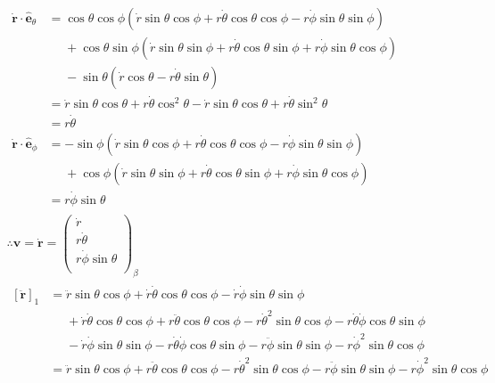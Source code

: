 \documentclass[12pt]{article}
\begin{document}
\begin{gather*}
	\begin{aligned}
		\dot{\mathbf{r}} \cdot \hat{\mathbf{e}}_\theta &= 
			\cos\theta\cos\phi (\dot{r}\sin\theta\cos\phi +
				r\dot{\theta}\cos\theta\cos\phi - r\dot{\phi}\sin\theta\sin\phi) \\
			&\phantom{=}+ \cos\theta\sin\phi (\dot{r}\sin\theta\sin\phi +
				r\dot{\theta}\cos\theta\sin\phi + r\dot{\phi}\sin\theta\cos\phi) \\
			&\phantom{=}- \sin\theta (\dot{r}\cos\theta - r\dot{\theta}\sin\theta) \\
		&= \dot{r}\sin\theta\cos\theta + r\dot{\theta}\cos^2\theta
			- \dot{r}\sin\theta\cos\theta + r\dot{\theta}\sin^2\theta \\
		&= r\dot{\theta} \\
		\dot{\mathbf{r}} \cdot \hat{\mathbf{e}}_\phi &= 
			-\sin\phi (\dot{r}\sin\theta\cos\phi +
				r\dot{\theta}\cos\theta\cos\phi - r\dot{\phi}\sin\theta\sin\phi) \\
			&\phantom{=}+ \cos\phi (\dot{r}\sin\theta\sin\phi +
				r\dot{\theta}\cos\theta\sin\phi + r\dot{\phi}\sin\theta\cos\phi) \\
		&= r\dot{\phi}\sin\theta
	\end{aligned} \\
	\therefore \mathbf{v} = \dot{\mathbf{r}} = \left( \begin{array}{c}
			\dot{r} \\
			r\dot{\theta} \\
			r\dot{\phi}\sin\theta \\
		\end{array} \right)_\beta \\
	\begin{aligned}
		[\ddot{\mathbf{r}}]_1 &= 
			\ddot{r}\sin\theta\cos\phi + \dot{r}\dot{\theta}\cos\theta\cos\phi
				- \dot{r}\dot{\phi}\sin\theta\sin\phi \\
			&\phantom{=} + \dot{r}\dot{\theta}\cos\theta\cos\phi 
				+ r\ddot{\theta}\cos\theta\cos\phi - r\dot{\theta}^2\sin\theta\cos\phi 
				- r\dot{\theta}\dot{\phi}\cos\theta\sin\phi \\
			&\phantom{=}- \dot{r}\dot{\phi}\sin\theta\sin\phi
				- r\dot{\theta}\dot{\phi}\cos\theta\sin\phi 
				- r\ddot{\phi}\sin\theta\sin\phi - r\dot{\phi}^2\sin\theta\cos\phi \\
		&= \ddot{r}\sin\theta\cos\phi 
				+ r\ddot{\theta}\cos\theta\cos\phi - r\dot{\theta}^2\sin\theta\cos\phi 
				- r\ddot{\phi}\sin\theta\sin\phi - r\dot{\phi}^2\sin\theta\cos\phi  \\

\end{aligned}
\end{gather*}
\end{document}
